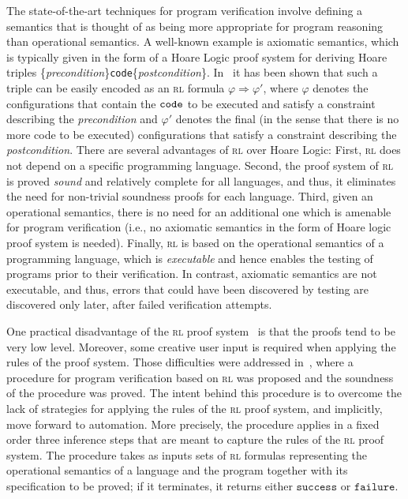 \documentclass[conference]{IEEEtran}
\newenvironment{todo}{\medskip\hrule\smallskip\noindent}{\smallskip\hrule\medskip}
\newcommand{\vr}[1]{\begin{todo}\textcolor{blue}{Vlad:}\\ \color{orange}{#1}\color{black}\end{todo}}
\newcommand{\vr}[1]{}
\newcommand{\failure}{\mathtt{failure}}
\newcommand{\success}{\mathtt{success}}
\newcommand{\Ra}{\Rightarrow}
\newcommand{\RL}{\textsc{rl}\xspace}
\newcommand{\rrule}[2]{{#1} \Ra{#2}}
\newcommand{\coq}[1]{{\small \textit{#1}}}
\newcommand{\coqtt}[1]{{\small \texttt{#1}}}
\begin{document}
The state-of-the-art techniques for program verification involve defining a semantics that is thought of as being more appropriate for program reasoning than operational semantics.
A well-known example is axiomatic semantics, which is typically given in the form of a Hoare Logic proof system for deriving Hoare triples \{\coq{precondition}\}\coqtt{code}\{\coq{postcondition}\}.
In~\cite{rosu-stefanescu-2012-fm} it has been shown that such a triple can be easily encoded as an \RL formula $\rrule{\varphi}{\varphi'}$, where $\varphi$ denotes the configurations that contain the $\coqtt{code}$ to be executed and satisfy a constraint describing the \coq{precondition}
and $\varphi'$ denotes the final (in the sense that there is no more code to be executed) configurations that satisfy a constraint describing the \coq{postcondition}.
There are several advantages of \RL over Hoare Logic:
First, \RL does not depend on a specific programming language. 
Second, the proof system of \RL~\cite{stefanescu-ciobaca-mereuta-moore-serbanuta-rosu-2014-rta} is proved \emph{sound}
and relatively complete 
for all languages, and thus, it eliminates the need for non-trivial soundness proofs for each language.
Third, given an operational semantics, there is no need for an additional one which is amenable for program verification (i.e., no axiomatic semantics in the form of Hoare logic proof system is needed).
Finally,  \RL is based on the operational semantics of a programming language, which is \emph{executable} and hence enables the testing of programs  prior to their verification.
In contrast, axiomatic semantics are not executable, and thus,   errors that could have been discovered by testing are discovered only later,  after failed verification attempts.

One practical disadvantage of the \RL proof system~\cite{stefanescu-ciobaca-mereuta-moore-serbanuta-rosu-2014-rta} is that the proofs tend to be very low level. 
Moreover, some creative user input is required when applying the rules of the proof system.
Those difficulties were addressed in~\cite{lucanu-rusu-arusoaie-nowak-LRC2015}, where a  procedure 
for program verification based on  \RL was proposed and the soundness of the procedure was proved.
The intent behind this procedure is to overcome the lack of strategies for applying the rules of the \RL proof system, and implicitly, move forward to automation.
More precisely, the procedure applies in a fixed order three inference steps that are meant to capture the rules of the \RL proof system.
The procedure takes as inputs sets of \RL formulas representing the operational semantics of a language and the program together with its specification to be proved; if it terminates, it returns either $\success$ or $\failure$.
\end{document}
